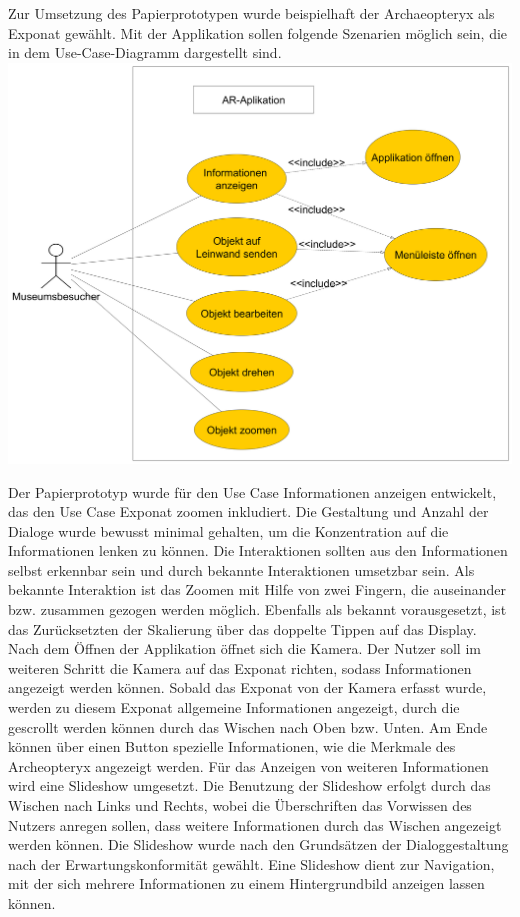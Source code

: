 \documentclass[runningheads,a4paper]{llncs}
\begin{document}
Zur Umsetzung des Papierprototypen wurde beispielhaft der Archaeopteryx als Exponat gewählt. Mit der Applikation sollen folgende Szenarien möglich sein, die in dem Use-Case-Diagramm dargestellt sind.\\

\includegraphics[scale=0.2]{use_c_museum}

Der Papierprototyp wurde für den Use Case Informationen anzeigen entwickelt, das den Use Case Exponat zoomen inkludiert. Die Gestaltung und Anzahl der Dialoge wurde bewusst minimal gehalten, um die Konzentration auf die Informationen lenken zu können. Die Interaktionen sollten aus den Informationen selbst erkennbar sein und durch bekannte Interaktionen umsetzbar sein. Als bekannte Interaktion ist das Zoomen mit Hilfe von zwei Fingern, die auseinander bzw. zusammen gezogen werden möglich. Ebenfalls als bekannt vorausgesetzt, ist das Zurücksetzten der Skalierung über das doppelte Tippen auf das Display. Nach dem Öffnen der Applikation öffnet sich die Kamera. Der Nutzer soll im weiteren Schritt die Kamera auf das Exponat richten, sodass Informationen angezeigt werden können. Sobald das Exponat von der Kamera erfasst wurde, werden zu diesem Exponat allgemeine Informationen angezeigt, durch die gescrollt werden können durch das Wischen nach Oben bzw. Unten. Am Ende können über einen Button spezielle Informationen, wie die Merkmale des Archeopteryx angezeigt werden.
Für das Anzeigen von weiteren Informationen wird eine Slideshow umgesetzt. Die Benutzung der Slideshow erfolgt durch das Wischen nach Links und Rechts, wobei die Überschriften das Vorwissen des Nutzers anregen sollen, dass weitere Informationen durch das Wischen angezeigt werden können. Die Slideshow wurde nach den Grundsätzen der Dialoggestaltung nach der Erwartungskonformität gewählt. Eine Slideshow dient zur Navigation, mit der sich mehrere Informationen zu einem Hintergrundbild anzeigen lassen können.\\
\end{document}

